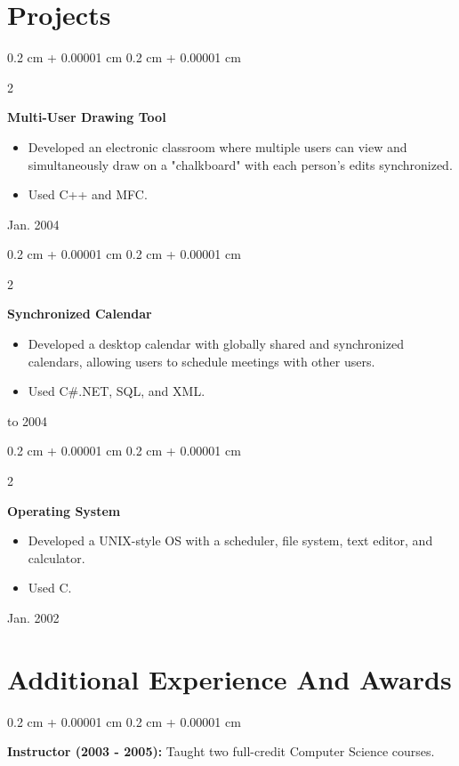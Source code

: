 \documentclass[10pt, letterpaper]{article}
\newenvironment{highlights}{
	\begin{itemize}[
		topsep=0.10 cm,
		parsep=0.10 cm,
		partopsep=0pt,
		itemsep=0pt,
		leftmargin=0.4 cm + 10pt
		]
	}{
	\end{itemize}
} %
\newenvironment{onecolentry}{
	\begin{adjustwidth}{
			0.2 cm + 0.00001 cm
		}{
			0.2 cm + 0.00001 cm
		}
	}{
	\end{adjustwidth}
} %
\newenvironment{twocolentry}[2][]{
	\onecolentry
	\def\secondColumn{#2}
	\setcolumnwidth{\fill, 4.5 cm}
	\begin{paracol}{2}
	}{
		\switchcolumn \raggedleft \secondColumn
	\end{paracol}
	\endonecolentry
} %
\begin{document}
	
	
	\section{Projects}
	
	
	\begin{twocolentry}{
			Jan. 2004
		}
		\textbf{Multi-User Drawing Tool}
		\begin{highlights}
			\item Developed an electronic classroom where multiple users can view and simultaneously draw on a "chalkboard" with each person's edits synchronized.
			\item Used C++ and MFC.
		\end{highlights}
	\end{twocolentry}
	
	
	\vspace{0.2 cm}
	
	\begin{twocolentry}{
			2003 to 2004
		}
		\textbf{Synchronized Calendar}
		\begin{highlights}
			\item Developed a desktop calendar with globally shared and synchronized calendars, allowing users to schedule meetings with other users.
			\item Used C\#.NET, SQL, and XML.
		\end{highlights}
	\end{twocolentry}
	
	
	\vspace{0.2 cm}
	
	\begin{twocolentry}{
			Jan. 2002
		}
		\textbf{Operating System}
		\begin{highlights}
			\item Developed a UNIX-style OS with a scheduler, file system, text editor, and calculator.
			\item Used C.
		\end{highlights}
	\end{twocolentry}
	
	
	
	
	\section{Additional Experience And Awards}
	
	
	\begin{onecolentry}
		\textbf{Instructor (2003 - 2005):} Taught two full-credit Computer Science courses.
	\end{onecolentry}
	
\end{document}
